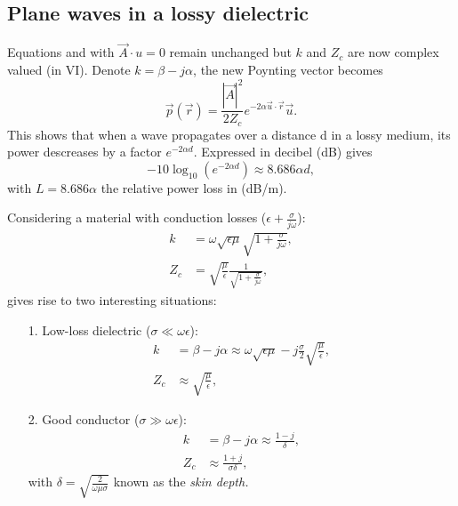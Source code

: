\documentclass[a4paper, 10pt]{article}
\begin{document}
    \subsection*{Plane waves in a lossy dielectric}
    Equations  and  with $\vec{A}\cdot u=0$ remain unchanged but $k$ and $Z_c$ are now complex valued (in VI). 
    Denote $k=\beta-j\alpha$, the new Poynting vector becomes 
    \begin{equation}\vec{p}(\vec{r})=\frac{|\vec{A}|^2}{2Z_c}e^{-2\alpha\vec{u}\cdot\vec{r}}\vec{u}.\label{H5eq4}\end{equation}
    This shows that when a wave propagates over a distance d in a lossy medium, its power descreases by a factor $e^{-2\alpha d}$. Expressed in decibel (dB) gives
    \begin{equation}-10\log_{10}(e^{-2\alpha d})\approx 8.686\alpha d,\label{H5eq5}\end{equation} with $L=8.686\alpha$ the relative power loss in (dB/m).

    Considering a material with conduction losses ($\epsilon + \frac{\sigma}{j\omega}$):
    \begin{align}
        k & = \omega\sqrt{\epsilon\mu}\sqrt{1+\frac{\sigma}{j\omega}}\label{H5eq6},\\
        Z_c & = \sqrt{\frac{\mu}{\epsilon}}\frac{1}{\sqrt{1+\frac{\sigma}{j\omega}}}\label{H5eq7},
    \end{align}
    gives rise to two interesting situations:
    \begin{itemize}
        \item[1.] Low-loss dielectric ($\sigma \ll \omega\epsilon$):
        \begin{align}
            k & = \beta - j\alpha \approx \omega\sqrt{\epsilon\mu} - j\frac{\sigma}{2}\sqrt{\frac{\mu}{\epsilon}} \label{H5eq8},\\
            Z_c & \approx \sqrt{\frac{\mu}{\epsilon}} \label{H5eq9},
        \end{align}
        \item[2.] Good conductor ($\sigma \gg \omega\epsilon$):
        \begin{align}
            k & = \beta - j\alpha \approx \frac{1-j}{\delta} \label{H5eq10},\\
            Z_c & \approx \frac{1+j}{\sigma\delta} \label{H5eq11},
        \end{align}
        with $\delta = \sqrt{\frac{2}{\omega\mu\sigma}}$ known as the \it{skin depth}.
    \end{itemize}
\end{document}
